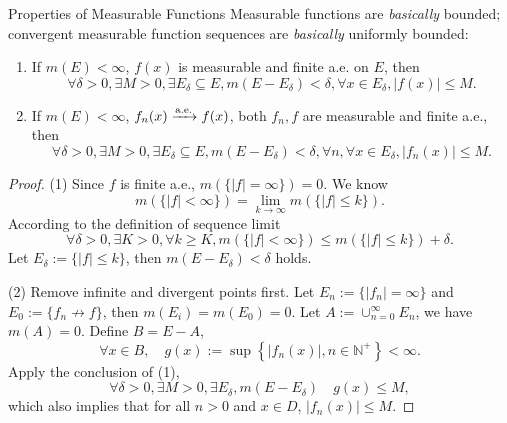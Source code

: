 \begin{example}{Properties of Measurable Functions}{}
  Measurable functions are \emph{basically} bounded;
  convergent measurable function sequences are \emph{basically} uniformly bounded:
  \begin{enumerate}
  \item If $m(E) < \infty$, $f(x)$ is measurable and finite a.e. on $E$, then
    \begin{equation}
      \forall \delta > 0, \exists M > 0, \exists E_{\delta} \subseteq E, m(E - E_{\delta}) < \delta,
      \forall x \in E_{\delta}, |f(x)| \leq M.
    \end{equation}
  \item If $m(E) < \infty$, $f_n(x) \xrightarrow{\text{a.e.}} f(x)$, both $f_n, f$ are measurable
    and finite a.e., then
    \begin{equation}
      \forall \delta > 0, \exists M > 0, \exists E_{\delta} \subseteq E, m(E - E_{\delta}) < \delta,
      \forall n, \forall x \in E_{\delta}, |f_n(x)| \leq M.
    \end{equation}
  \end{enumerate}
\end{example}

\begin{proof}
  (1) Since $f$ is finite a.e., $m(\{|f| = \infty\}) = 0$. We know
  \begin{equation}
    m(\{|f| < \infty\})
    = \lim \limits _{k \rightarrow \infty} m(\{|f| \leq k\}).
  \end{equation}
  According to the definition of sequence limit
  \begin{equation}
    \forall \delta > 0, \exists K > 0, \forall k \geq K,
    m(\{|f| < \infty\}) \leq m(\{|f| \leq k\}) + \delta.
  \end{equation}
  Let $E_{\delta} := \{|f| \leq k\}$, then $m(E - E_{\delta}) < \delta$ holds.

  (2) Remove infinite and divergent points first.
  Let $E_n := \{|f_n| = \infty\}$ and $E_0 := \{f_n \not \rightarrow f\}$,
  then $m(E_i) = m(E_0) = 0$.
  Let $A := \cup _{n = 0}^{\infty} E_n$, we have $m(A) = 0$.
  Define $B = E - A$,
  \begin{equation}
    \forall x \in B, \quad g(x) := \sup \left\{ |f_n(x)| , n \in \mathbb{N}^+\right\} < \infty.
  \end{equation}
  Apply the conclusion of (1),
  \begin{equation}
    \forall \delta > 0, \exists M > 0, \exists E_{\delta}, m(E - E_{\delta})
    \quad g(x) \leq M,
  \end{equation}
  which also implies that for all $n > 0$ and $x \in D$, $|f_n(x)| \leq M$.
\end{proof}

